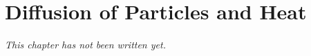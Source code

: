 \chapter{Diffusion of Particles and Heat}\label{ch:b2:diffusion}


\emph{This chapter has not been written yet.}
